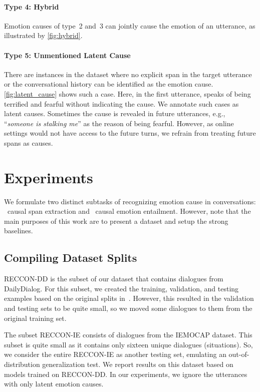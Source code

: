 \documentclass[smallextended]{svjour3}
\newcommand\RECCON{recognizing emotion cause in conversations} \newcommand\ECRIC{ECRIC}
\newcommand\RECCONDADD{RECCON-DD}
\newcommand\RECCONDAIE{RECCON-IE}
\newcommand\DailyDialog{Daily\-Dialog}
\newcommand\0{\hphantom{0}}
\begin{document}
\paragraph{Type 4: Hybrid} Emotion causes of type~2 and~3 can jointly cause the emotion of an utterance, as illustrated by \cref{fig:hybrid}.




\paragraph{Type 5: Unmentioned Latent Cause} There are instances in the dataset where no explicit span in the target utterance or the conversational history can be identified as the emotion cause. \cref{fig:latent_cause} shows such a case. Here, in the first utterance,  speaks of being terrified and fearful without indicating the cause. We annotate such cases as latent causes. Sometimes the cause is revealed in future utterances, e.g., ``\textit{someone is stalking me}'' as the reason of being fearful. However, as online settings would not have access to the future turns, we refrain from treating future spans as 
causes.


\section{Experiments}
\label{sec:experiments}

We formulate two distinct subtasks of \RECCON{}: \textit{}~causal span extraction and \textit{}~causal emotion entailment. However, 
note that
the main purposes of this work are to present a dataset and setup the strong baselines. 


\subsection{Compiling Dataset Splits}
\label{sec:dataprep}

\RECCONDADD{} is the subset of our dataset that contains dialogues from \DailyDialog{}. For this subset, we created the training, validation, and testing examples based on the original splits in~\cite{li2017DailyDialog}. However, this resulted in the validation and testing sets to be quite small, so we moved some dialogues to them from the original training set. 

The subset \RECCONDAIE{} consists of dialogues from the IEMOCAP dataset. This subset is quite small as it contains only sixteen unique dialogues (situations). So, we consider the entire \RECCONDAIE{}  as another testing set, emulating an out-of-distribution generalization test. We report results on this dataset based on models trained on \RECCONDADD{}. In our experiments, we ignore the utterances with only latent emotion causes. 
\end{document}

